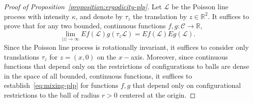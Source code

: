 \documentclass[AHL, Unicode, longabstracts, published]{cedram}
\newcommand{\zz}[1]{\mathbb #1}
\begin{document}
\begin{proof}[Proof of Proposition~\ref{proposition:ergodicity-plp}]
Let $\mathcal{L}$ be the Poisson line process with intensity $\kappa$, and denote by $\tau_{z}$ the translation by $z\in \zz{R}^{2}$. It suffices to prove that for any two bounded, continuous functions $f,g:\mathcal{C}\rightarrow \zz{R}$,
\begin{equation}\label{eq:mixing-plp}
\lim_{|z| \rightarrow \infty}Ef (\mathcal{L})g (\tau_{z}\mathcal{L})=Ef (\mathcal{L})Eg (\mathcal{L}).
\end{equation}
Since the Poisson line process is rotationally invariant, it suffices to consider only translations $\tau_{z}$ for $z= (x,0)$ on the $x-$axis. Moreover, since continuous functions that depend only on the restrictions of configurations to balls are dense in the space of all bounded, continuous functions, it suffices to establish~\eqref{eq:mixing-plp} for functions $f,g$ that depend only on configurational restrictions to the ball of radius $r>0$ centered at the origin.


\end{proof}
\end{document}
